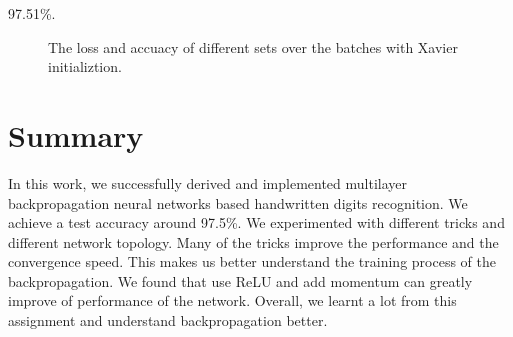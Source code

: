 \documentclass{article} %
\begin{document}
97.51\%.

\begin{figure} [!htbp]
	
	\caption{The loss and accuacy of different sets over the batches with Xavier initializtion. }  
	
\end{figure}

\section{Summary}
In this work, we successfully derived and implemented multilayer backpropagation neural networks based handwritten digits recognition. We achieve a test accuracy around 97.5\%. We experimented with different tricks and different network topology. Many of the tricks improve the performance and the convergence speed. This makes us better understand the training process of the backpropagation. We found that use ReLU and add momentum can greatly improve of performance of the network. Overall, we learnt a lot from this assignment and understand backpropagation better.
\end{document}
